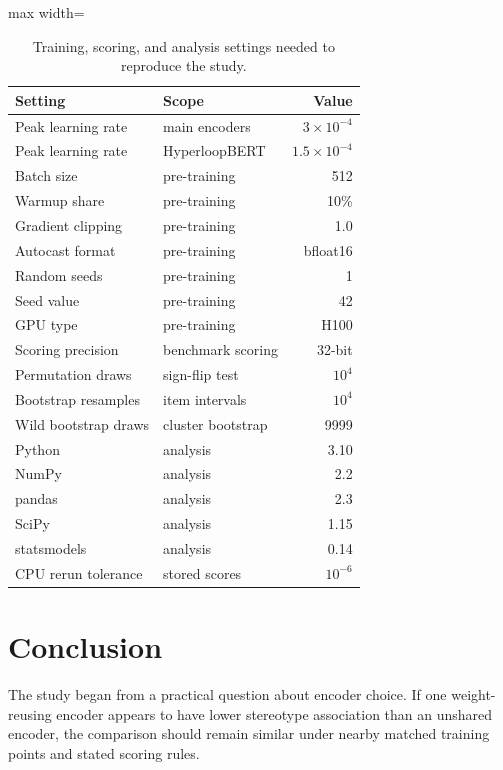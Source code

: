 \documentclass[sigconf,natbib=true,anonymous=true]{acmart}
\begin{document}
\begin{table}[t]
\centering
\caption{Training, scoring, and analysis settings needed to reproduce the study.}
\label{tab:reprosettings}
\footnotesize
\begin{adjustbox}{max width=\columnwidth}
\begin{tabular}{llr}
\toprule
Setting & Scope & Value \\
\midrule
Peak learning rate & main encoders & $3 \times 10^{-4}$ \\
Peak learning rate & HyperloopBERT & $1.5 \times 10^{-4}$ \\
Batch size & pre-training & 512 \\
Warmup share & pre-training & 10\% \\
Gradient clipping & pre-training & 1.0 \\
Autocast format & pre-training & bfloat16 \\
Random seeds & pre-training & 1 \\
Seed value & pre-training & 42 \\
GPU type & pre-training & H100 \\
Scoring precision & benchmark scoring & 32-bit \\
Permutation draws & sign-flip test & $10^4$ \\
Bootstrap resamples & item intervals & $10^4$ \\
Wild bootstrap draws & cluster bootstrap & 9999 \\
Python & analysis & 3.10 \\
NumPy & analysis & 2.2 \\
pandas & analysis & 2.3 \\
SciPy & analysis & 1.15 \\
statsmodels & analysis & 0.14 \\
CPU rerun tolerance & stored scores & $10^{-6}$ \\
\bottomrule
\end{tabular}
\end{adjustbox}
\end{table}

\section{Conclusion}
\label{sec:conclusion}

The study began from a practical question about encoder choice. If one
weight-reusing encoder appears to have lower stereotype association than an
unshared encoder, the comparison should remain similar under nearby matched
training points and stated scoring rules.
\end{document}
